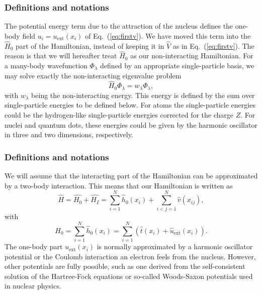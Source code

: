 \frame
{
  \frametitle{Definitions and notations}
\begin{small}
{\scriptsize
The potential energy term due to the attraction of the nucleus defines the one-body field $u_i=u_{\mathrm{ext}}(x_i)$ of Eq.~(\ref{eq:firstv}).
We have moved this term into the $\hat{H}_0$ part of the Hamiltonian, instead of keeping  it in $\hat{V}$ as in  Eq.~(\ref{eq:firstv}).
The reason is that we will hereafter treat $\hat{H}_0$ as our non-interacting  Hamiltonian. For a many-body wavefunction $\Phi_{\lambda}$ defined by an  
appropriate single-particle basis, we may solve exactly the non-interacting eigenvalue problem 
\[
\hat{H}_0\Phi_{\lambda}= w_{\lambda}\Phi_{\lambda},
\]
with $w_{\lambda}$ being the non-interacting energy. This energy is defined by the sum over single-particle energies to be defined below.
For atoms the single-particle energies could be the hydrogen-like single-particle energies corrected for the charge $Z$. For nuclei and quantum
dots, these energies could be given by the harmonic oscillator in three and two dimensions, respectively.
}
\end{small}
}

\frame
{
  \frametitle{Definitions and notations}
\begin{small}
{\scriptsize
We will assume that the interacting part of the Hamiltonian
can be approximated by a two-body interaction.
This means that our Hamiltonian is written as 
\begin{equation}
    \hat{H} = \hat{H_0} + \hat{H_I} 
    = \sum_{i=1}^N \hat{h}_0(x_i) + \sum_{i<j=1}^N \hat{v}(x_{ij}),
\label{Hnuclei}
\end{equation}
with 
\begin{equation}
  H_0=\sum_{i=1}^N \hat{h}_0(x_i) =  \sum_{i=1}^N\left(\hat{t}(x_i) + \hat{u}_{\mathrm{ext}}(x_i)\right).
\label{hinuclei}
\end{equation}
The one-body part $u_{\mathrm{ext}}(x_i)$ is normally approximated by a harmonic oscillator potential or the Coulomb interaction an electron feels from the nucleus. However, other potentials are fully possible, such as 
one derived from the self-consistent solution of the Hartree-Fock equations or so-called Woods-Saxon potentials used in nuclear physics.
}
\end{small}
}



